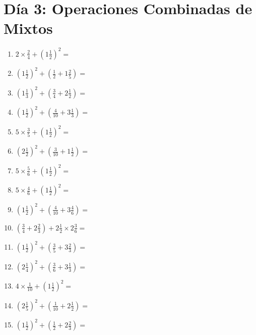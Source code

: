 \documentclass[12pt]{article}
\begin{document}
\section*{Día 3: Operaciones Combinadas de Mixtos}
\begin{enumerate}
\item \large $ 2 \times \frac{2}{4} + (1 \frac{1}{2})^2 = $ \vspace{1.8cm}
\item \large $ (1 \frac{1}{2})^2 + (\frac{1}{2} + 1 \frac{2}{5}) = $ \vspace{1.8cm}
\item \large $ (1 \frac{1}{3})^2 + (\frac{3}{4} + 2 \frac{1}{2}) = $ \vspace{1.8cm}
\item \large $ (1 \frac{1}{2})^2 + (\frac{4}{10} + 3 \frac{1}{3}) = $ \vspace{1.8cm}
\item \large $ 5 \times \frac{3}{5} + (1 \frac{1}{2})^2 = $ \vspace{1.8cm}
\item \large $ (2 \frac{1}{2})^2 + (\frac{3}{10} + 1 \frac{1}{2}) = $ \vspace{1.8cm}
\item \large $ 5 \times \frac{5}{6} + (1 \frac{1}{2})^2 = $ \vspace{1.8cm}
\item \large $ 5 \times \frac{4}{6} + (1 \frac{1}{2})^2 = $ \vspace{1.8cm}
\item \large $ (1 \frac{1}{2})^2 + (\frac{4}{10} + 3 \frac{4}{6}) = $ \vspace{1.8cm}
\item \large $ (\frac{3}{4} + 2 \frac{2}{3}) + 2 \frac{1}{2} \times 2 \frac{3}{6} = $ \vspace{1.8cm}
\newpage
\item \large $ (1 \frac{1}{2})^2 + (\frac{3}{5} + 3 \frac{2}{3}) = $ \vspace{1.8cm}
\item \large $ (2 \frac{1}{4})^2 + (\frac{3}{6} + 3 \frac{1}{3}) = $ \vspace{1.8cm}
\item \large $ 4 \times \frac{1}{10} + (1 \frac{1}{2})^2 = $ \vspace{1.8cm}
\item \large $ (2 \frac{1}{5})^2 + (\frac{1}{10} + 2 \frac{1}{2}) = $ \vspace{1.8cm}
\item \large $ (1 \frac{1}{2})^2 + (\frac{1}{2} + 2 \frac{2}{3}) = $ \vspace{1.8cm}

\end{enumerate}
\end{document}
